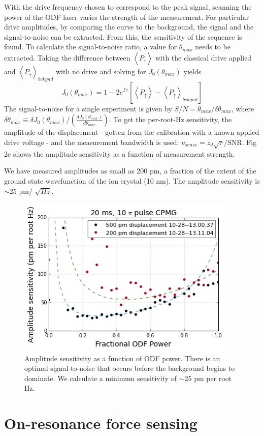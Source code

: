 \documentclass[aps,prl,twocolumn,groupedaddress]{revtex4-1}
\begin{document}
With the drive frequency chosen to correspond to the peak signal, scanning the power of the ODF laser varies the strength of the measurement. For particular drive amplitudes, by comparing the curve to the background, the signal and the signal-to-noise can be extracted. From this, the sensitivity of the sequence is found. To calculate the signal-to-noise ratio, a value for $\theta_{max}$ needs to be extracted. Taking the difference between $\left< P_{\uparrow} \right>$ with the classical drive applied and $\left< P_{\uparrow} \right>_{bckgnd}$ with no drive and solving for $J_0(\theta_{max})$ yields
\[J_0(\theta_{max}) = 1 - 2e^{\Gamma \tau} \left[ \left< P_{\uparrow} \right> - \left< P_{\uparrow} \right>_{bckgnd} \right] \]
The signal-to-noise for a single experiment is given by $S/N =\theta_{max}/\delta \theta_{max}$, where $\delta \theta_{max} \equiv \delta J_0(\theta_{max})/ \left( \frac{dJ_0(\theta_{max})}{d\theta_{max}} \right)$. To get the per-root-Hz sensitivity, the amplitude of the displacement - gotten from the calibration with a known applied drive voltage - and the measurement bandwidth is used: $\nu_{sense} = z_d\sqrt{\tau}/$SNR. Fig 2e shows the amplitude sensitivity as a function of measurement strength.

We have measured amplitudes as small as 200 pm, a fraction of the extent of the ground state wavefunction of the ion crystal (10 nm). The amplitude sensitivity is $\sim$25 pm/ $ \sqrt{Hz}$.

\begin{figure}
\includegraphics[width=.25\textwidth]{amp_sense_both}
\caption{Amplitude sensitivity as a function of ODF power. There is an optimal signal-to-noise that occurs before the background begins to dominate. We calculate a minimum sensitivity of $\sim$25 pm per root Hz.}\label{Fig 3}
\end{figure}

\section{On-resonance force sensing}
\end{document}
